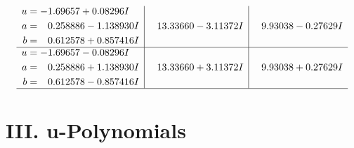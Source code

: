 \documentclass[1p]{elsarticle_modified}
\theoremstyle{definition}
\begin{document}
$$\begin{array}{c|c|c}
\begin{aligned}
u &= -1.69657 + 0.08296 I \\
a &= \phantom{-}0.258886 - 1.138930 I \\
b &= \phantom{-}0.612578 + 0.857416 I\end{aligned}
 & \phantom{-}13.33660 - 3.11372 I & \phantom{-}9.93038 - 0.27629 I \\ \hline\begin{aligned}
u &= -1.69657 - 0.08296 I \\
a &= \phantom{-}0.258886 + 1.138930 I \\
b &= \phantom{-}0.612578 - 0.857416 I\end{aligned}
 & \phantom{-}13.33660 + 3.11372 I & \phantom{-}9.93038 + 0.27629 I\\
 \hline 
 \end{array}$$\newpage
\newpage\renewcommand{\arraystretch}{1}
\centering \section*{ III. u-Polynomials}
\end{document}
